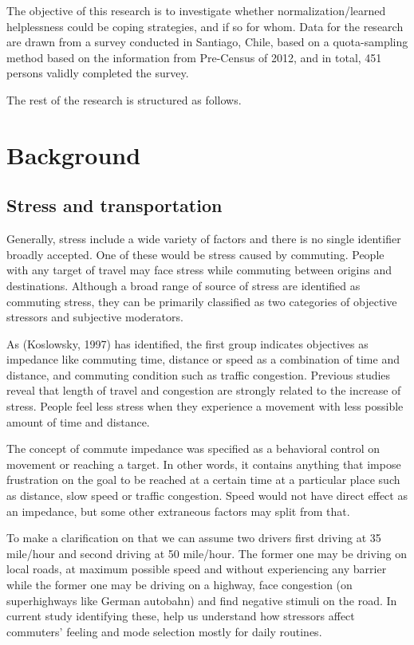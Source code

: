 \documentclass[
11pt, %
oneside, %
english, %
singlespacing, %
]{macthesis} %
\begin{document}
The objective of this research is to investigate whether normalization/learned helplessness could be coping strategies, and if so for whom. Data for the research are drawn from a survey conducted in Santiago, Chile, based on a quota-sampling method based on the information from Pre-Census of 2012, and in total, 451 persons validly completed the survey.

The rest of the research is structured as follows.

\hypertarget{background-1}{%
\section{Background}\label{background-1}}

\hypertarget{stress-and-transportation}{%
\subsection{Stress and transportation}\label{stress-and-transportation}}

Generally, stress include a wide variety of factors and there is no single identifier broadly accepted. One of these would be stress caused by commuting. People with any target of travel may face stress while commuting between origins and destinations. Although a broad range of source of stress are identified as commuting stress, they can be primarily classified as two categories of objective stressors and subjective moderators.

As (Koslowsky, 1997) has identified, the first group indicates objectives as impedance like commuting time, distance or speed as a combination of time and distance, and commuting condition such as traffic congestion. Previous studies reveal that length of travel and congestion are strongly related to the increase of stress. People feel less stress when they experience a movement with less possible amount of time and distance.

The concept of commute impedance was specified as a behavioral control on movement or reaching a target. In other words, it contains anything that impose frustration on the goal to be reached at a certain time at a particular place such as distance, slow speed or traffic congestion. Speed would not have direct effect as an impedance, but some other extraneous factors may split from that.

To make a clarification on that we can assume two drivers first driving at 35 mile/hour and second driving at 50 mile/hour. The former one may be driving on local roads, at maximum possible speed and without experiencing any barrier while the former one may be driving on a highway, face congestion (on superhighways like German autobahn) and find negative stimuli on the road. In current study identifying these, help us understand how stressors affect commuters' feeling and mode selection mostly for daily routines.
\end{document}
